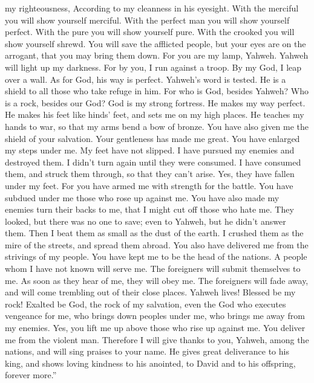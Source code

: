 my righteousness, According to my cleanness in his eyesight.
 With the merciful you will show yourself merciful. With
the perfect man you will show yourself perfect.  With the
pure you will show yourself pure. With the crooked you will show
yourself shrewd.  You will save the afflicted people, but
your eyes are on the arrogant, that you may bring them down.
 For you are my lamp, Yahweh. Yahweh will light up my
darkness.  For by you, I run against a troop. By my God,
I leap over a wall.  As for God, his way is perfect.
Yahweh's word is tested. He is a shield to all those who take refuge in
him.  For who is God, besides Yahweh? Who is a rock,
besides our God?  God is my strong fortress. He makes my
way perfect.  He makes his feet like hinds' feet, and
sets me on my high places.  He teaches my hands to war,
so that my arms bend a bow of bronze.  You have also
given me the shield of your salvation. Your gentleness has made me
great.  You have enlarged my steps under me. My feet have
not slipped.  I have pursued my enemies and destroyed
them. I didn't turn again until they were consumed.  I
have consumed them, and struck them through, so that they can't arise.
Yes, they have fallen under my feet.  For you have armed
me with strength for the battle. You have subdued under me those who
rose up against me.  You have also made my enemies turn
their backs to me, that I might cut off those who hate me.
 They looked, but there was no one to save; even to
Yahweh, but he didn't answer them.  Then I beat them as
small as the dust of the earth. I crushed them as the mire of the
streets, and spread them abroad.  You also have delivered
me from the strivings of my people. You have kept me to be the head of
the nations. A people whom I have not known will serve me.
 The foreigners will submit themselves to me. As soon as
they hear of me, they will obey me.  The foreigners will
fade away, and will come trembling out of their close places.
 Yahweh lives! Blessed be my rock! Exalted be God, the
rock of my salvation,  even the God who executes
vengeance for me, who brings down peoples under me,  who
brings me away from my enemies. Yes, you lift me up above those who rise
up against me. You deliver me from the violent man. 
Therefore I will give thanks to you, Yahweh, among the nations, and will
sing praises to your name.  He gives great deliverance to
his king, and shows loving kindness to his anointed, to David and to his
offspring, forever more.''

